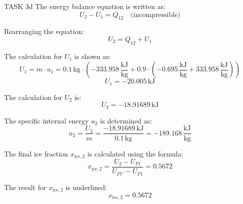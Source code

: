 TASK 3d  
The energy balance equation is written as:  
\[
U_2 - U_1 = Q_{12} \quad \text{(incompressible)}
\]  

Rearranging the equation:  
\[
U_2 = Q_{12} + U_1
\]  

The calculation for \( U_1 \) is shown as:  
\[
U_1 = m \cdot u_1 = 0.1 \, \text{kg} \cdot \left( -333.958 \, \frac{\text{kJ}}{\text{kg}} + 0.9 \cdot (-0.695 \, \frac{\text{kJ}}{\text{kg}} + 333.958 \, \frac{\text{kJ}}{\text{kg}}) \right)
\]  
\[
U_1 = -20.005 \, \text{kJ}
\]  

The calculation for \( U_2 \) is:  
\[
U_2 = -18.91689 \, \text{kJ}
\]  

The specific internal energy \( u_2 \) is determined as:  
\[
u_2 = \frac{U_2}{m} = \frac{-18.91689 \, \text{kJ}}{0.1 \, \text{kg}} = -189.168 \, \frac{\text{kJ}}{\text{kg}}
\]  

The final ice fraction \( x_{\text{ice},2} \) is calculated using the formula:  
\[
x_{\text{ice},2} = \frac{U_2 - U_{F1}}{U_{FC} - U_{F1}} = 0.5672
\]  

The result for \( x_{\text{ice},2} \) is underlined:  
\[
x_{\text{ice},2} = 0.5672
\]